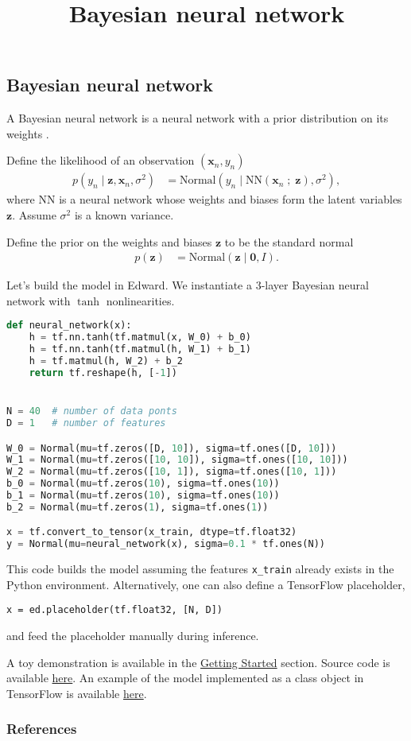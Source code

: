 \title{Bayesian neural network}

\subsection{Bayesian neural network}

A Bayesian neural network is a neural network with a prior
distribution on its weights \citep{neal2012bayesian}.

Define the likelihood of an observation $(\mathbf{x}_n, y_n)$
\begin{align*}
  p(y_n \mid \mathbf{z}, \mathbf{x}_n, \sigma^2)
  &=
  \text{Normal}(y_n \mid \mathrm{NN}(\mathbf{x}_n\;;\;\mathbf{z}), \sigma^2),
\end{align*}
where $\mathrm{NN}$ is a neural network whose weights and biases form
the latent variables $\mathbf{z}$. Assume $\sigma^2$ is a
known variance.

Define the prior on the weights and biases $\mathbf{z}$ to be the standard normal
\begin{align*}
  p(\mathbf{z})
  &=
  \text{Normal}(\mathbf{z} \mid \mathbf{0}, I).
\end{align*}

Let's build the model in Edward. We
instantiate a 3-layer Bayesian neural network with $\tanh$
nonlinearities.
\begin{lstlisting}[language=Python]
def neural_network(x):
    h = tf.nn.tanh(tf.matmul(x, W_0) + b_0)
    h = tf.nn.tanh(tf.matmul(h, W_1) + b_1)
    h = tf.matmul(h, W_2) + b_2
    return tf.reshape(h, [-1])


N = 40  # number of data ponts
D = 1   # number of features

W_0 = Normal(mu=tf.zeros([D, 10]), sigma=tf.ones([D, 10]))
W_1 = Normal(mu=tf.zeros([10, 10]), sigma=tf.ones([10, 10]))
W_2 = Normal(mu=tf.zeros([10, 1]), sigma=tf.ones([10, 1]))
b_0 = Normal(mu=tf.zeros(10), sigma=tf.ones(10))
b_1 = Normal(mu=tf.zeros(10), sigma=tf.ones(10))
b_2 = Normal(mu=tf.zeros(1), sigma=tf.ones(1))

x = tf.convert_to_tensor(x_train, dtype=tf.float32)
y = Normal(mu=neural_network(x), sigma=0.1 * tf.ones(N))
\end{lstlisting}
This code builds the model assuming the features \texttt{x\_train}
already exists in the Python environment. Alternatively, one can also
define a TensorFlow placeholder,
\begin{lstlisting}
x = ed.placeholder(tf.float32, [N, D])
\end{lstlisting}
and feed the placeholder manually during inference.

A toy demonstration is available in the \href{/getting-started}{Getting Started} section.
Source code is available
\href{https://github.com/blei-lab/edward/blob/master/examples/bayesian_nn.py}
{here}.
An example of the model implemented as a class object in TensorFlow is
available
\href{https://github.com/blei-lab/edward/blob/master/examples/tf_bayesian_nn.py}
{here}.

\subsubsection{References}\label{references}
